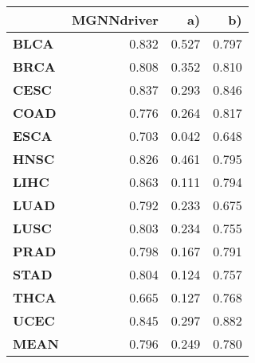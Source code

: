 \begin{tabular}{lrrr}
\toprule
{} &  MGNNdriver &     a) &     b) \\
\midrule
\textbf{BLCA} &       0.832 &  0.527 &  0.797 \\
\textbf{BRCA} &       0.808 &  0.352 &  0.810 \\
\textbf{CESC} &       0.837 &  0.293 &  0.846 \\
\textbf{COAD} &       0.776 &  0.264 &  0.817 \\
\textbf{ESCA} &       0.703 &  0.042 &  0.648 \\
\textbf{HNSC} &       0.826 &  0.461 &  0.795 \\
\textbf{LIHC} &       0.863 &  0.111 &  0.794 \\
\textbf{LUAD} &       0.792 &  0.233 &  0.675 \\
\textbf{LUSC} &       0.803 &  0.234 &  0.755 \\
\textbf{PRAD} &       0.798 &  0.167 &  0.791 \\
\textbf{STAD} &       0.804 &  0.124 &  0.757 \\
\textbf{THCA} &       0.665 &  0.127 &  0.768 \\
\textbf{UCEC} &       0.845 &  0.297 &  0.882 \\
\textbf{MEAN} &       0.796 &  0.249 &  0.780 \\
\bottomrule
\end{tabular}
